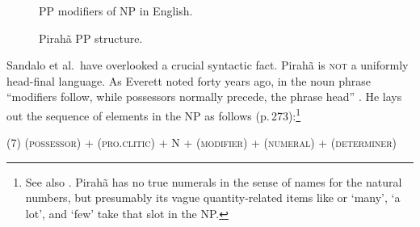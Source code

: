 \documentclass[output=paper,colorlinks,citecolor=brown
]{langscibook}
\begin{document}
\begin{figure}
\begin{floatrow}
\ffigbox[.39\textwidth]{%
\resizebox{.39\textwidth}{!}{%
\begin{forest}
[NP [N [coin] ] 
    [PP [P [on] ] 
        [NP [N [paper] ]
            [PP [P [on] ] 
                [NP [N [chair] ]
                    [PP [P [on] ] 
                    [NP [N [board] ] ] ] ] ] ] ] ]
\end{forest}}}
{\caption{PP modifiers of NP in English.}\label{fig:pullum:1a}}
\ffigbox[.58\textwidth]{%
\resizebox{.58\textwidth}{!}{%
\begin{forest}
[NP [PP [NP [PP [NP [PP [NP 
     [N [tabo\\board] ] ] [P [apo\\on] ] ]
     [N [tiapapati\\chair] ] ] [P [apo\\on] ] ]
     [N [kapiiga\\paper] ] ] [P [apo\\on] ] ]
     [N [gigohoi\\coin] ] ]
\end{forest}}}
{\caption{ Pirahã PP structure.}\label{fig:pullum:1b}}
\end{floatrow}
\end{figure}


Sandalo et al.\ have overlooked a crucial syntactic fact. Pirah{\~a} is
\textsc{not} a uniformly head-final language. As Everett noted forty
years ago, in the noun phrase ``modifiers follow, while possessors normally
precede, the phrase head'' \citep[272]{Everett86HAL}. He lays out
the sequence of elements in the NP as follows
(p.\,273):\footnote{\label{nonumerals}
   See also \citet[132ff]{Everett83}. Pirah{\~a} has no true
   numerals in the sense of names for the natural numbers, but presumably
   its vague quantity-related items like  or
    `many',
    `a lot', and
    `few' take that slot in the NP.}

\medskip\noindent
(7)\quad
(\textsc{possessor}) + (\textsc{pro.clitic}) + N + (\textsc{modifier})
+ (\textsc{numeral}) + (\textsc{determiner})
\end{document}
